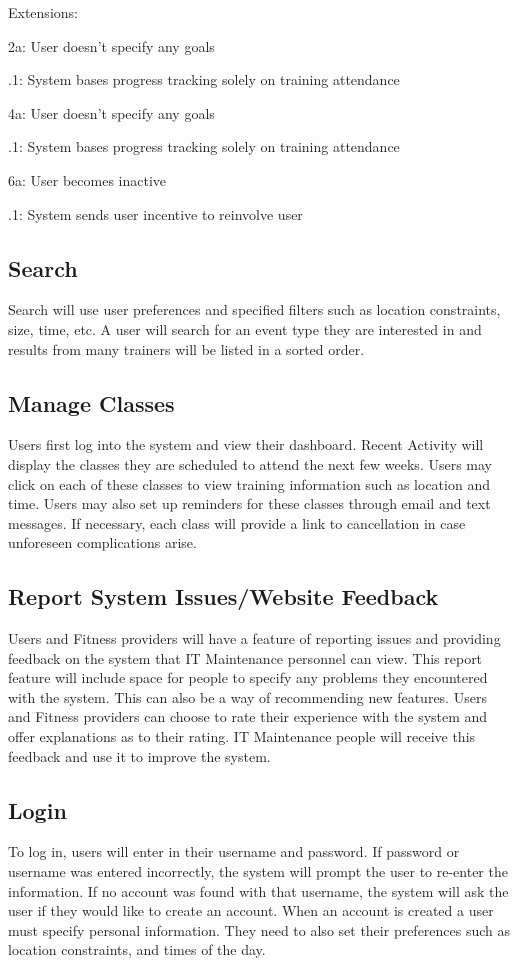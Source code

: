 \documentclass[12pt]{article}
\begin{document}
\noindent Extensions:

\noindent 2a: User doesn’t specify any goals
	
	.1: System bases progress tracking solely on training attendance

\noindent 4a: User doesn’t specify any goals

	.1: System bases progress tracking solely on training attendance
	
\noindent 6a: User becomes inactive

	.1: System sends user incentive to reinvolve user

\subsection{Search} 
Search will use user preferences and specified filters such as location constraints, size, time, etc.  A user will search for an event type they are interested in and results from many trainers will be listed in a sorted order.

\subsection{Manage Classes}  
Users first log into the system and view their dashboard. Recent Activity will display the classes they are scheduled to attend the next few weeks.  Users may click on each of these classes to view training information such as location and time.  Users may also set up reminders for these classes through email and text messages.  If necessary, each class will provide a link to cancellation in case unforeseen complications arise.

\subsection{Report System Issues/Website Feedback}
Users and Fitness providers will have a feature of reporting issues and providing feedback on the system that IT Maintenance personnel can view.  This report feature will include space for people to specify any problems they encountered with the system.  This can also be a way of recommending new features.  Users and Fitness providers can choose to rate their experience with the system and offer explanations as to their rating.  IT Maintenance people will receive this feedback and use it to improve the system.

\subsection{Login}
To log in, users will enter in their username and password. If password or username was entered incorrectly, the system will prompt the user to re-enter the information. If no account was found with that username, the system will ask the user if they would like to create an account. When an account is created a user must specify personal information.  They need to also set their preferences such as location constraints, and times of the day.
\end{document}
